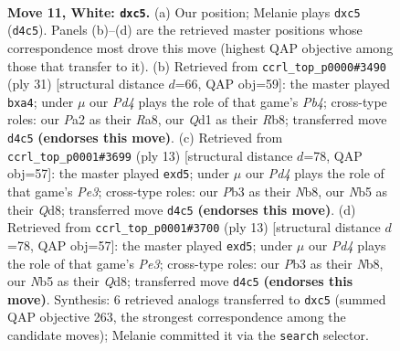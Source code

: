 \documentclass[11pt]{article}
\begin{document}
\clearpage

\begin{figure}[p]\centering
\begin{subfigure}{0.46\textwidth}\centering
\resizebox{\linewidth}{!}{%
\newchessgame
\chessboard[
  setfen={rnbk3r/pp1nq1p1/4p3/1NppPp1p/3P1P2/1P5N/P1P3PP/R2QKB1R w KQ - 0 11},
  showmover=false,
  pgfstyle=straightmove, color=movearrow, markmove={d4-c5}
]}
\caption{}
\end{subfigure}\hfill
\begin{subfigure}{0.46\textwidth}\centering
\resizebox{\linewidth}{!}{%
\newchessgame
\chessboard[
  setfen={rr4k1/2pqb1p1/p2ppn1p/1p6/Pn1PP3/4BN1P/1P2QPP1/RN2R1K1 b - - 2 16},
  showmover=false,
  pgfstyle=straightmove, color=movearrow, markmove={b5-a4}
]}
\caption{}
\end{subfigure}
\\[4pt]
\begin{subfigure}{0.46\textwidth}\centering
\resizebox{\linewidth}{!}{%
\newchessgame
\chessboard[
  setfen={rn1qkb1r/pb3ppp/1p1ppn2/2pP4/4P3/5NP1/PPP1QPBP/RNB1K2R b KQkq - 0 7},
  showmover=false,
  pgfstyle=straightmove, color=movearrow, markmove={e6-d5}
]}
\caption{}
\end{subfigure}\hfill
\begin{subfigure}{0.46\textwidth}\centering
\resizebox{\linewidth}{!}{%
\newchessgame
\chessboard[
  setfen={rn1qkb1r/pb3ppp/1p1ppn2/2pP4/4P3/5NP1/PPP1QPBP/RNB1K2R b KQkq - 0 7},
  showmover=false,
  pgfstyle=straightmove, color=movearrow, markmove={e6-d5}
]}
\caption{}
\end{subfigure}
\caption{\textbf{Move 11, White: \texttt{dxc5}.} (a) Our position; Melanie plays \texttt{dxc5} (\texttt{d4c5}). Panels (b)--(d) are the retrieved master positions whose correspondence most drove this move (highest QAP objective among those that transfer to it). (b) Retrieved from \texttt{ccrl\_top\_p0000\#3490} (ply 31) [structural distance $d$=66, QAP obj=59]: the master played \texttt{bxa4}; under $\mu$ our \emph{Pd4} plays the role of that game's \emph{Pb4}; cross-type roles: our \emph{P}a2 as their \emph{R}a8, our \emph{Q}d1 as their \emph{R}b8; transferred move \texttt{d4c5} \textbf{(endorses this move)}. (c) Retrieved from \texttt{ccrl\_top\_p0001\#3699} (ply 13) [structural distance $d$=78, QAP obj=57]: the master played \texttt{exd5}; under $\mu$ our \emph{Pd4} plays the role of that game's \emph{Pe3}; cross-type roles: our \emph{P}b3 as their \emph{N}b8, our \emph{N}b5 as their \emph{Q}d8; transferred move \texttt{d4c5} \textbf{(endorses this move)}. (d) Retrieved from \texttt{ccrl\_top\_p0001\#3700} (ply 13) [structural distance $d$=78, QAP obj=57]: the master played \texttt{exd5}; under $\mu$ our \emph{Pd4} plays the role of that game's \emph{Pe3}; cross-type roles: our \emph{P}b3 as their \emph{N}b8, our \emph{N}b5 as their \emph{Q}d8; transferred move \texttt{d4c5} \textbf{(endorses this move)}. Synthesis: 6 retrieved analogs transferred to \texttt{dxc5} (summed QAP objective 263, the strongest correspondence among the candidate moves); Melanie committed it via the \texttt{search} selector.}
\label{fig:thought-m20}
\end{figure}
\end{document}
